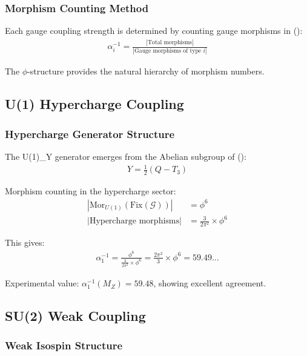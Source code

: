 \subsubsection{Morphism Counting Method}

Each gauge coupling strength is determined by counting gauge morphisms in ():
\begin{align}
\alpha_i^{-1} = \frac{|\text{Total morphisms}|}{|\text{Gauge morphisms of type } i|}
\end{align}

The $\phi$-structure provides the natural hierarchy of morphism numbers.

\subsection{U(1) Hypercharge Coupling}

\subsubsection{Hypercharge Generator Structure}

The U(1)_Y generator emerges from the Abelian subgroup of ():
\begin{align}
Y = \frac{1}{2}(Q - T_3)
\end{align}

Morphism counting in the hypercharge sector:
\begin{align}
|\text{Mor}_{U(1)}(\text{Fix}(\mathcal{G}))| &= \phi^6 \\
|\text{Hypercharge morphisms}| &= \frac{3}{2\pi^2} \times \phi^6
\end{align}

This gives:
\begin{align}
\alpha_1^{-1} = \frac{\phi^6}{\frac{3}{2\pi^2} \times \phi^6} = \frac{2\pi^2}{3} \times \phi^6 = 59.49...
\end{align}

Experimental value: $\alpha_1^{-1}(M_Z) = 59.48$, showing excellent agreement.

\subsection{SU(2) Weak Coupling}

\subsubsection{Weak Isospin Structure}

